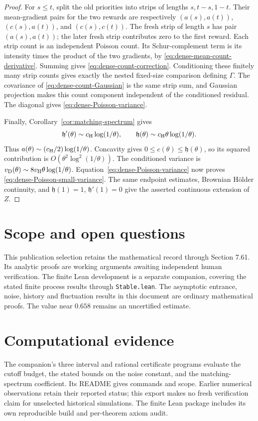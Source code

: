 \documentclass[11pt,letterpaper]{article}
\begin{document}
\begin{proof}
For $s\le t$, split the old priorities into strips of
lengths $s,t-s,1-t$. Their mean-gradient pairs for the two
rewards are respectively
$(a(s),a(t))$, $(c(s),a(t))$, and $(c(s),c(t))$.
The fresh strip of length $s$ has pair $(a(s),a(t))$;
the later fresh strip contributes zero to the first reward.
Each strip count is an independent Poisson count.
Its Schur-complement term is its intensity times the
product of the two gradients, by
\eqref{eq:dense-mean-count-derivative}.
Summing gives \eqref{eq:dense-count-correction}.
Conditioning these finitely many strip counts gives
exactly the nested fixed-size comparison defining $\Gamma$.
The covariance of \eqref{eq:dense-count-Gaussian} is the
same strip sum, and Gaussian projection makes this
count component independent of the conditioned residual.
The diagonal gives \eqref{eq:dense-Poisson-variance}.

Finally, Corollary~\ref{cor:matching-spectrum} gives
\[
 \mathfrak h'(\theta)\sim c_{\rm H}\log(1/\theta),\qquad
 \mathfrak h(\theta)\sim c_{\rm H}\theta\log(1/\theta).
\]
Thus $a(\theta)\sim(c_{\rm H}/2)\log(1/\theta)$.
Concavity gives $0\le c(\theta)\le\mathfrak h(\theta)$,
so its squared contribution is
$O(\theta^2\log^2(1/\theta))$.
The conditioned variance is
$v_{\rm D}(\theta)\sim8v_{\rm H}\theta\log(1/\theta)$.
Equation~\eqref{eq:dense-Poisson-variance} now proves
\eqref{eq:dense-Poisson-small-variance}.
The same endpoint estimates, Brownian H\"older continuity,
and $\mathfrak h(1)=1$, $\mathfrak h'(1)=0$ give the
asserted continuous extension of $Z$.
\end{proof}


\section{Scope and open questions}\label{sec:frontier}
This publication selection retains the mathematical record through Section 7.61.
Its analytic proofs are working arguments awaiting independent human verification.
The finite Lean development is a separate companion, covering the stated finite
process results through \texttt{Stable.lean}. The asymptotic entrance, noise,
history and fluctuation results in this document are ordinary mathematical proofs.
The value near $0.658$ remains an uncertified estimate.
\section{Computational evidence}\label{sec:ledger}
The companion's three interval and rational certificate programs evaluate the
cutoff budget, the stated bounds on the noise constant, and the matching-spectrum
coefficient. Its README gives commands and scope. Earlier numerical observations
retain their reported status; this export makes no fresh verification claim for
unselected historical simulations. The finite Lean package includes its own
reproducible build and per-theorem axiom audit.
\end{document}
